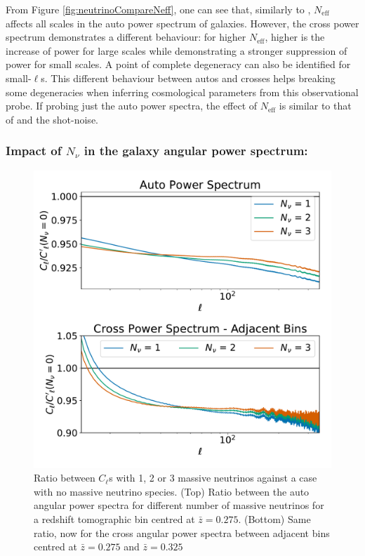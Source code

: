 \qquad From Figure \ref{fig:neutrinoCompareNeff}, one can see that, similarly to \NM, $N_{\text{eff}}$ affects all scales in the auto power spectrum of galaxies. However, the cross power spectrum demonstrates a different behaviour: for higher $N_{\text{eff}}$, higher is the increase of power for large scales while demonstrating a stronger suppression of power for small scales. A point of complete degeneracy can also be identified for small-$\ell$s. This different behaviour between autos and crosses helps breaking some degeneracies when inferring cosmological parameters from this observational probe. If probing just the auto power spectra, the effect of $N_{\text{eff}}$ is similar to that of \NM{} and the shot-noise.

\subsubsection{Impact of $N_{\nu}$ in the galaxy angular power spectrum:}
\begin{figure}
\begin{center}
\includegraphics[scale=0.50]{Neutrino-FIGS/Neutrinos_Nnu.pdf}
\caption[Impact of the number massive neutrinos in the angular power spectra of galaxies.]{Ratio between $C_{\ell}$s with 1, 2 or 3 massive neutrinos against a case with no massive neutrino species. (Top) Ratio between the auto angular power spectra for different number of massive neutrinos for a redshift tomographic bin centred at $\bar{z} = 0.275$. (Bottom) Same ratio, now for the cross angular power spectra between adjacent bins centred at $\bar{z} = 0.275$ and $\bar{z} = 0.325$}
\label{fig:neutrinoCompareNnu}
\end{center}
\end{figure}

